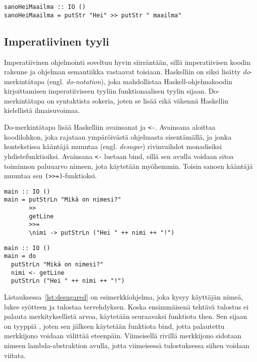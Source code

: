 \documentclass[finnish]{tktltiki2}
\begin{document}
\begin{lstlisting}[float,label={lst:then},caption={Fixme}]
sanoHeiMaailma :: IO ()
sanoHeiMaailma = putStr "Hei" >> putStr " maailma"
\end{lstlisting}

\subsection{Imperatiivinen tyyli}

Imperatiivinen ohjelmointi soveltuu hyvin siirräntään, sillä imperatiivisen koodin rakenne ja
ohjelman semantiikka vastaavat toisiaan. Haskelliin on siksi lisätty \emph{do}-merkintätapa (engl.
\emph{do-notation}), joka mahdollistaa Haskell-ohjelmakoodin kirjoittamisen imperatiiviseen tyyliin
funktionaalisen tyylin sijaan. Do-merkintätapa on syntaktista sokeria, joten se lisää eikä vähennä
Haskellin kielellistä ilmaisuvoimaa.

Do-merkintätapa lisää Haskelliin avainsanat  ja \verb|<-|. Avainsana  aloittaa
koodilohkon, joka rajataan ympäröivästä ohjelmasta sisentämällä, ja jonka kontekstissa kääntäjä
muuntaa (engl. \emph{desugar}) rivinvaihdot monadisiksi yhdistefunktioiksi. Avainsana \verb|<-|
luetaan bind, sillä sen avulla voidaan sitoa toiminnon paluuarvo nimeen, jota käytetään myöhemmin.
Toisin sanoen kääntäjä muuntaa sen \verb|(>>=)|-funktioksi.

\begin{lstlisting}[float,label={lst:desugared},caption={Funktionaalinen tyyli}]
main :: IO ()
main = putStrLn "Mikä on nimesi?"
       >>
       getLine
       >>=
       \nimi -> putStrLn ("Hei " ++ nimi ++ "!")
\end{lstlisting}

\begin{lstlisting}[float,label={lst:donotation},caption={Imperatiivinen tyyli ja do-merkintätapa}]
main :: IO ()
main = do
  putStrLn "Mikä on nimesi?"
  nimi <- getLine
  putStrLn ("Hei " ++ nimi ++ "!")
\end{lstlisting}

Listauksessa~\ref{lst:desugared} on esimerkkiohjelma, joka kysyy käyttäjän nimeä, lukee syötteen ja
tulostaa tervehdyksen. Koska ensimmäisenä tehtävä tulostus ei palauta merkityksellistä arvoa,
käytetään seuraavaksi funktiota then. Sen sijaan  on tyyppiä , joten
sen jälkeen käytetään funktiota bind, jotta palautettu merkkijono voidaan välittää eteenpäin.
Viimeisellä rivillä merkkijono sidotaan nimeen  lambda-abstraktion avulla, jotta
viimeisessä tulostuksessa siihen voidaan viitata.
\end{document}
